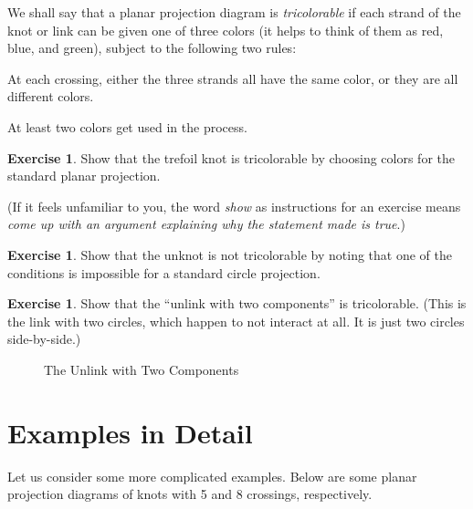 \documentclass[12pt,letterpaper]{article}
\theoremstyle{definition}
\newtheorem{exercise}[question]{Exercise}
\begin{document}
We shall say that a planar projection diagram is \emph{tricolorable} if each strand of the knot or link can be given one of three colors (it helps to think of them as red, blue, and green), subject to the following two rules:
\begin{compactitem}
\item At each crossing, either the three strands all have the same color, or they are all different colors.
\item At least two colors get used in the process.
\end{compactitem}

\begin{exercise}
Show that the trefoil knot is tricolorable by choosing colors for the standard planar projection.
\end{exercise}

(If it feels unfamiliar to you, the word \emph{show} as instructions for an exercise means \emph{come up with an argument explaining why the statement made is true}.)

\begin{exercise}
Show that the unknot is not tricolorable by noting that one of the conditions is impossible for a standard circle projection.
\end{exercise}

\begin{exercise}
Show that the ``unlink with two components'' is tricolorable.
(This is the link with two circles, which happen to not interact at all.
It is just two circles side-by-side.)
\end{exercise}

\begin{figure}[h]
    \centering
    \caption{The Unlink with Two Components}
\end{figure}

\section*{Examples in Detail}
Let us consider some more complicated examples. 
Below are some planar projection diagrams of knots with 5 and 8 crossings, respectively.
\end{document}
